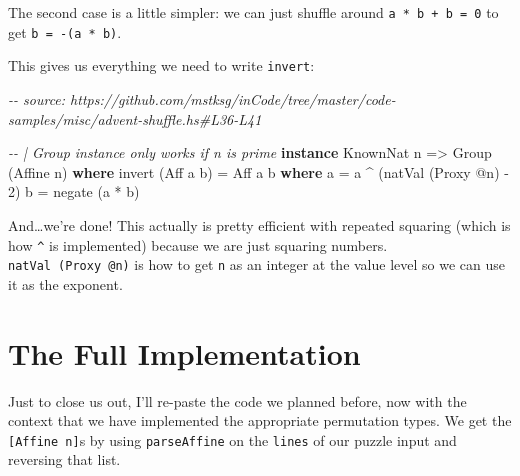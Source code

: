 \documentclass[]{article}
\newenvironment{Shaded}{}{}
\newcommand{\CommentTok}[1]{\textcolor[rgb]{0.38,0.63,0.69}{\textit{#1}}}
\newcommand{\DataTypeTok}[1]{\textcolor[rgb]{0.56,0.13,0.00}{#1}}
\newcommand{\DecValTok}[1]{\textcolor[rgb]{0.25,0.63,0.44}{#1}}
\newcommand{\FunctionTok}[1]{\textcolor[rgb]{0.02,0.16,0.49}{#1}}
\newcommand{\KeywordTok}[1]{\textcolor[rgb]{0.00,0.44,0.13}{\textbf{#1}}}
\newcommand{\NormalTok}[1]{#1}
\newcommand{\OperatorTok}[1]{\textcolor[rgb]{0.40,0.40,0.40}{#1}}
\newcommand{\OtherTok}[1]{\textcolor[rgb]{0.00,0.44,0.13}{#1}}
\begin{document}
The second case is a little simpler: we can just shuffle around
\texttt{a\textquotesingle{}\ *\ b\ +\ b\textquotesingle{}\ =\ 0} to get
\texttt{b\textquotesingle{}\ =\ -(a\textquotesingle{}\ *\ b)}.

This gives us everything we need to write \texttt{invert}:

\begin{Shaded}
\begin{Highlighting}[]
\CommentTok{{-}{-} source: https://github.com/mstksg/inCode/tree/master/code{-}samples/misc/advent{-}shuffle.hs\#L36{-}L41}

\CommentTok{{-}{-} | Group instance only works if n is prime}
\KeywordTok{instance} \DataTypeTok{KnownNat}\NormalTok{ n }\OtherTok{=>} \DataTypeTok{Group}\NormalTok{ (}\DataTypeTok{Affine}\NormalTok{ n) }\KeywordTok{where}
\NormalTok{    invert (}\DataTypeTok{Aff}\NormalTok{ a b) }\OtherTok{=} \DataTypeTok{Aff}\NormalTok{ a\textquotesingle{} b\textquotesingle{}}
      \KeywordTok{where}
\NormalTok{        a\textquotesingle{} }\OtherTok{=}\NormalTok{ a }\OperatorTok{\^{}}\NormalTok{ (natVal (}\DataTypeTok{Proxy} \OperatorTok{@}\NormalTok{n) }\OperatorTok{{-}} \DecValTok{2}\NormalTok{)}
\NormalTok{        b\textquotesingle{} }\OtherTok{=} \FunctionTok{negate}\NormalTok{ (a\textquotesingle{} }\OperatorTok{*}\NormalTok{ b)}
\end{Highlighting}
\end{Shaded}

And\ldots we're done! This actually is pretty efficient with repeated squaring
(which is how \texttt{\^{}} is implemented) because we are just squaring
numbers. \texttt{natVal\ (Proxy\ @n)} is how to get \texttt{n} as an integer at
the value level so we can use it as the exponent.

\hypertarget{the-full-implementation}{%
\section{The Full Implementation}\label{the-full-implementation}}

Just to close us out, I'll re-paste the code we planned before, now with the
context that we have implemented the appropriate permutation types. We get the
\texttt{{[}Affine\ n{]}}s by using \texttt{parseAffine} on the \texttt{lines} of
our puzzle input and reversing that list.
\end{document}
